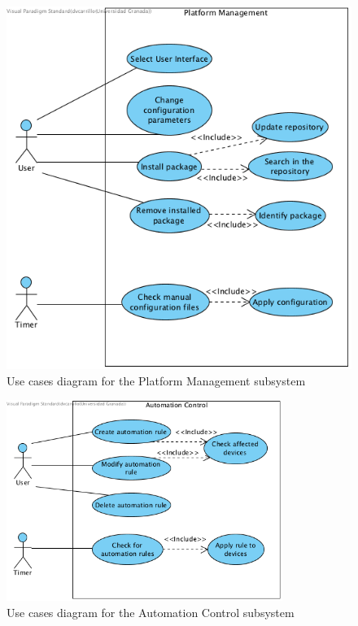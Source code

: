 \begin{figure}
	\centering
	\includegraphics[width=1\textwidth]{images/Chapter_06/UC-platform-management.png}
	\caption{Use cases diagram for the Platform Management subsystem}
	\label{fig:UC-platform-management}
\end{figure}

\begin{figure}
	\centering
	\includegraphics[width=0.8\textwidth]{images/Chapter_06/UC-automation-control.png}
	\caption{Use cases diagram for the Automation Control subsystem}
	\label{fig:UC-automation-control}
\end{figure}

